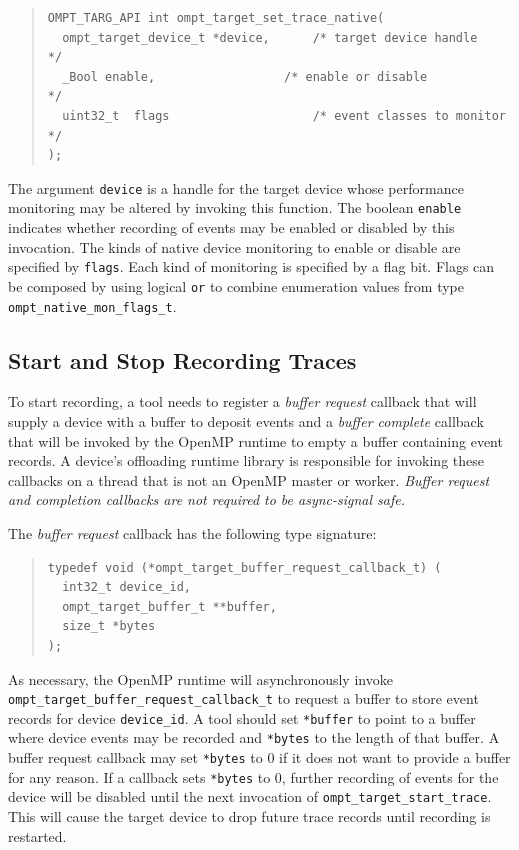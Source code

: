 \documentclass{article}
\begin{document}
\begin{quote}
\begin{verbatim}
OMPT_TARG_API int ompt_target_set_trace_native(
  ompt_target_device_t *device,      /* target device handle            */
  _Bool enable,                  /* enable or disable               */
  uint32_t  flags                    /* event classes to monitor        */
);
\end{verbatim}
\end{quote}
The argument \verb|device| is a handle for the target device whose performance monitoring may be altered by invoking this function. 
The boolean \verb|enable| indicates whether recording of events may be enabled or disabled by this invocation.
The kinds of native device monitoring to enable or disable are specified by \verb|flags|. Each kind of monitoring is specified by a flag bit. Flags can be composed by using logical {\tt or}  to combine enumeration values from type \verb|ompt_native_mon_flags_t|.

\subsection{Start and Stop Recording Traces}
\label{sec:start-stop-recording}

To start recording, a tool needs to register a \emph{buffer request} callback that will supply a device with a buffer to deposit events and a \emph{buffer complete} callback that will be invoked by the OpenMP runtime to empty a buffer containing event records. A device's offloading runtime library is responsible for invoking these callbacks on a thread that is not an OpenMP master or worker. {\em Buffer request and completion callbacks are not required to  be async-signal safe.}

The \emph{buffer request} callback has the following type signature:
\begin{quote}
\begin{verbatim}
typedef void (*ompt_target_buffer_request_callback_t) (
  int32_t device_id,
  ompt_target_buffer_t **buffer,
  size_t *bytes
);
\end{verbatim}
\end{quote}
As necessary, the OpenMP runtime will asynchronously invoke \verb|ompt_target_buffer_request_callback_t| to request a buffer to store event records for device \verb|device_id|.
A tool should set \verb|*buffer| to point to a buffer where device events may be recorded and \verb|*bytes| to the length of that buffer.
A buffer request callback  may set \verb|*bytes| to 0 if it does not want to provide a buffer for any reason. If a callback sets \verb|*bytes| to 0, further recording of events for the device will be disabled until the next invocation of \verb|ompt_target_start_trace|. This will cause the target device to drop future trace records until recording is restarted.
\end{document}
